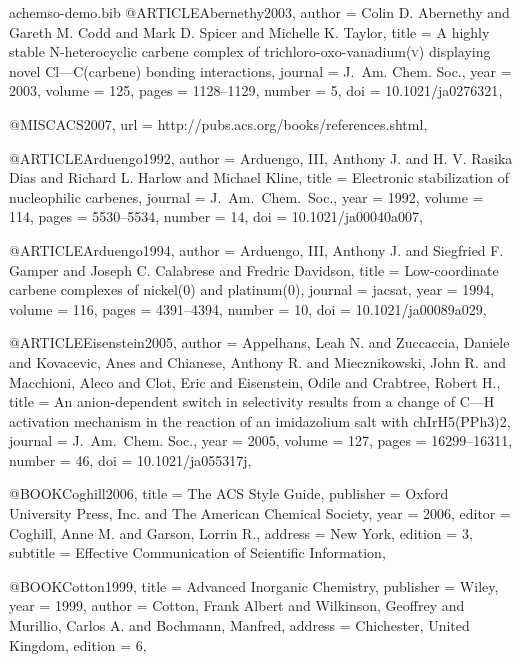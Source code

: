 \begin{filecontents}[noheader]{achemso-demo.bib}
@ARTICLE{Abernethy2003,
  author = {Colin D. Abernethy and Gareth M. Codd and Mark D. Spicer
    and Michelle K. Taylor},
  title = {A highly stable {N}-heterocyclic carbene complex of
    trichloro-oxo-vanadium(\textsc{v}) displaying novel
    {Cl}---{C}(carbene) bonding interactions},
  journal = {J.~Am. Chem. Soc.},
  year = {2003},
  volume = {125},
  pages = {1128--1129},
  number = {5},
  doi = {10.1021/ja0276321},
}

@MISC{ACS2007,
  url = {http://pubs.acs.org/books/references.shtml},
}

@ARTICLE{Arduengo1992,
  author = {Arduengo, III, Anthony J. and H. V. Rasika Dias and
    Richard L. Harlow and Michael Kline},
  title = {Electronic stabilization of nucleophilic carbenes},
  journal = {J.~Am.\ Chem.\ Soc.},
  year = {1992},
  volume = {114},
  pages = {5530--5534},
  number = {14},
  doi = {10.1021/ja00040a007},
}

@ARTICLE{Arduengo1994,
  author = {Arduengo, III, Anthony J. and Siegfried F. Gamper and
    Joseph C. Calabrese and Fredric Davidson},
  title = {{Low}-coordinate carbene complexes of nickel(0) and
    platinum(0)},
  journal = jacsat,
  year = {1994},
  volume = {116},
  pages = {4391--4394},
  number = {10},
  doi = {10.1021/ja00089a029},
}

@ARTICLE{Eisenstein2005,
  author = {Appelhans, Leah N. and Zuccaccia, Daniele and Kovacevic,
    Anes and Chianese, Anthony R. and Miecznikowski, John R. and
    Macchioni, Aleco and Clot, Eric and Eisenstein, Odile and
    Crabtree, Robert H.},
  title = {An anion-dependent switch in selectivity results from a
    change of {C}---{H} activation mechanism in the reaction of an
    imidazolium salt with ch{IrH5(PPh3)2}},
  journal = {J.~Am.\ Chem. Soc.},
  year = {2005},
  volume = {127},
  pages = {16299--16311},
  number = {46},
  doi = {10.1021/ja055317j},
}

@BOOK{Coghill2006,
  title = {The {ACS} Style Guide},
  publisher = {Oxford University Press, Inc. and
               The American Chemical Society},
  year = {2006},
  editor = {Coghill, Anne M. and Garson, Lorrin R.},
  address = {New York},
  edition = {3},
  subtitle = {{Effective} Communication of Scientific
    Information},
}

@BOOK{Cotton1999,
  title = {Advanced Inorganic Chemistry},
  publisher = {Wiley},
  year = {1999},
  author = {Cotton, Frank Albert and Wilkinson, Geoffrey and
    Murillio, Carlos A. and Bochmann, Manfred},
  address = {Chichester, United Kingdom},
  edition = {6},
}


\end{filecontents}
